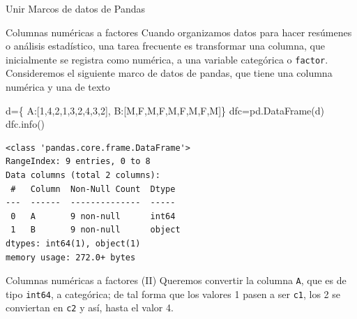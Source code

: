 \documentclass[
  ignorenonframetext,
  aspectratio=169,
  spanish,
]{beamer}
\newenvironment{Shaded}{\begin{snugshade}}{\end{snugshade}}
\newcommand{\DecValTok}[1]{\textcolor[rgb]{0.68,0.00,0.00}{#1}}
\newcommand{\NormalTok}[1]{\textcolor[rgb]{0.00,0.23,0.31}{#1}}
\newcommand{\OperatorTok}[1]{\textcolor[rgb]{0.37,0.37,0.37}{#1}}
\newcommand{\StringTok}[1]{\textcolor[rgb]{0.13,0.47,0.30}{#1}}
\begin{document}
\begin{frame}[fragile]{Unir Marcos de datos de Pandas}
\begin{block}{Columnas numéricas a factores}
\label{columnas-numuxe9ricas-a-factores}
Cuando organizamos datos para hacer resúmenes o análisis estadístico,
una tarea frecuente es transformar una columna, que inicialmente se
registra como numérica, a una variable categórica o \texttt{factor}.
Consideremos el siguiente marco de datos de pandas, que tiene una
columna numérica y una de texto

\begin{Shaded}
\begin{Highlighting}[]
\NormalTok{d}\OperatorTok{=}\NormalTok{\{ }\StringTok{\textquotesingle{}A\textquotesingle{}}\NormalTok{:[}\DecValTok{1}\NormalTok{,}\DecValTok{4}\NormalTok{,}\DecValTok{2}\NormalTok{,}\DecValTok{1}\NormalTok{,}\DecValTok{3}\NormalTok{,}\DecValTok{2}\NormalTok{,}\DecValTok{4}\NormalTok{,}\DecValTok{3}\NormalTok{,}\DecValTok{2}\NormalTok{],}
    \StringTok{\textquotesingle{}B\textquotesingle{}}\NormalTok{:[}\StringTok{\textquotesingle{}M\textquotesingle{}}\NormalTok{,}\StringTok{\textquotesingle{}F\textquotesingle{}}\NormalTok{,}\StringTok{\textquotesingle{}M\textquotesingle{}}\NormalTok{,}\StringTok{\textquotesingle{}F\textquotesingle{}}\NormalTok{,}\StringTok{\textquotesingle{}M\textquotesingle{}}\NormalTok{,}\StringTok{\textquotesingle{}F\textquotesingle{}}\NormalTok{,}\StringTok{\textquotesingle{}M\textquotesingle{}}\NormalTok{,}\StringTok{\textquotesingle{}F\textquotesingle{}}\NormalTok{,}\StringTok{\textquotesingle{}M\textquotesingle{}}\NormalTok{]\}}
\NormalTok{dfc}\OperatorTok{=}\NormalTok{pd.DataFrame(d) }
\NormalTok{dfc.info()}
\end{Highlighting}
\end{Shaded}

\begin{verbatim}
<class 'pandas.core.frame.DataFrame'>
RangeIndex: 9 entries, 0 to 8
Data columns (total 2 columns):
 #   Column  Non-Null Count  Dtype 
---  ------  --------------  ----- 
 0   A       9 non-null      int64 
 1   B       9 non-null      object
dtypes: int64(1), object(1)
memory usage: 272.0+ bytes
\end{verbatim}
\end{block}

\begin{block}{Columnas numéricas a factores (II)}
\label{columnas-numuxe9ricas-a-factores-ii}
Queremos convertir la columna \texttt{A}, que es de tipo \texttt{int64},
a categórica; de tal forma que los valores 1 pasen a ser \texttt{c1},
los 2 se conviertan en \texttt{c2} y así, hasta el valor 4.


\end{block}
\end{frame}
\end{document}
